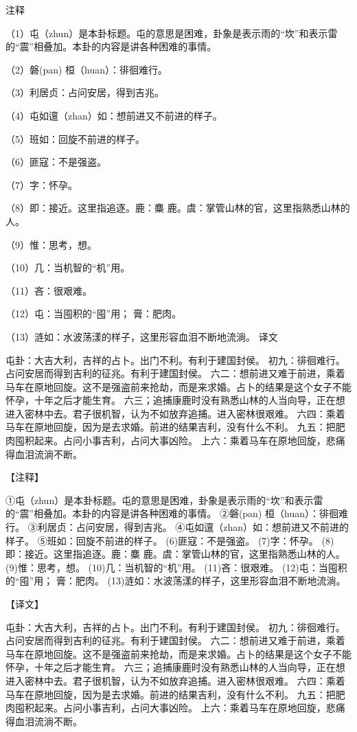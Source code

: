 \documentclass[12pt,UTF8]{ctexbook}
\begin{document}
注释

（1）屯（zhun）是本卦标题。屯的意思是困难，卦象是表示雨的“坎”和表示雷的“震”相叠加。本卦的内容是讲各种困难的事情。

（2）磐(pan) 桓（huan）：徘徊难行。

（3）利居贞：占问安居，得到吉兆。

（4）屯如邅（zhan）如：想前进又不前进的样子。

（5）班如：回旋不前进的样子。

（6）匪寇：不是强盗。

（7）字：怀孕。

（8）即：接近。这里指追逐。鹿：麋 鹿。虞：掌管山林的官，这里指熟悉山林的人。

（9）惟：思考，想。

（10）几：当机智的“机”用。

（11）吝：很艰难。

（12）屯：当囤积的“囤”用； 膏：肥肉。

（13）涟如：水波荡漾的样子，这里形容血泪不断地流淌。
译文

屯卦：大吉大利，吉祥的占卜。出门不利。有利于建国封侯。 初九：徘徊难行。占问安居而得到吉利的征兆。有利于建国封侯。 六二：想前进又难于前进，乘着马车在原地回旋。这不是强盗前来抢劫，而是来求婚。占卜的结果是这个女子不能怀孕，十年之后才能生育。 六三；追捕康鹿时没有熟悉山林的人当向导，正在想进入密林中去。君子很机智，认为不如放弃追捕。进入密林很艰难。 六四：乘着马车在原地回旋，因为是去求婚。前进的结果吉利，没有什么不利。 九五：把肥肉囤积起来。占问小事吉利，占问大事凶险。 上六：乘着马车在原地回旋，悲痛得血泪流淌不断。



【注释】

①屯（zhun）是本卦标题。屯的意思是困难，卦象是表示雨的“坎”和表示雷的“震”相叠加。本卦的内容是讲各种困难的事情。
②磐(pan) 桓（huan）：徘徊难行。
③利居贞：占问安居，得到吉兆。
④屯如邅（zhan）如：想前进又不前进的样子。
⑤班如：回旋不前进的样子。
(6)匪寇：不是强盗。
(7)字：怀孕。
(8)即：接近。这里指追逐。鹿：麋 鹿。虞：掌管山林的官，这里指熟悉山林的人。
(9)惟：思考，想。
(10)几：当机智的“机”用。
(11)吝：很艰难。
(12)屯：当囤积的“囤”用； 膏：肥肉。
(13)涟如：水波荡漾的样子，这里形容血泪不断地流淌。

【译文】

屯卦：大吉大利，吉祥的占卜。出门不利。有利于建国封侯。
初九：徘徊难行。占问安居而得到吉利的征兆。有利于建国封侯。
六二：想前进又难于前进，乘着马车在原地回旋。这不是强盗前来抢劫，而是来求婚。占卜的结果是这个女子不能怀孕，十年之后才能生育。
六三；追捕康鹿时没有熟悉山林的人当向导，正在想进入密林中去。君子很机智，认为不如放弃追捕。进入密林很艰难。
六四：乘着马车在原地回旋，因为是去求婚。前进的结果吉利，没有什么不利。
九五：把肥肉囤积起来。占问小事吉利，占问大事凶险。
上六：乘着马车在原地回旋，悲痛得血泪流淌不断。
\end{document}
